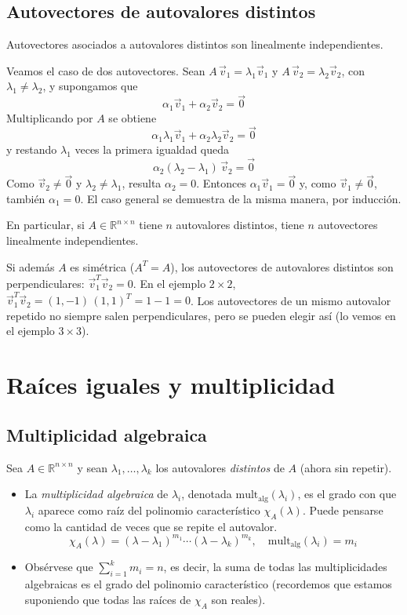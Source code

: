 \documentclass{article}
\newcommand{\vect}[1]{\vec{#1}}
\begin{document}
\subsection*{Autovectores de autovalores distintos}
Autovectores asociados a autovalores distintos son linealmente independientes.

Veamos el caso de dos autovectores. Sean \(A\,\vect{v}_1=\lambda_1 \vect{v}_1\) y \(A\,\vect{v}_2=\lambda_2 \vect{v}_2\), con \(\lambda_1\neq\lambda_2\), y supongamos que
\[
\alpha_1 \vect{v}_1+\alpha_2 \vect{v}_2=\vect{0}
\]
Multiplicando por \(A\) se obtiene
\[
\alpha_1\lambda_1 \vect{v}_1+\alpha_2\lambda_2 \vect{v}_2=\vect{0}
\]
y restando \(\lambda_1\) veces la primera igualdad queda
\[
\alpha_2(\lambda_2-\lambda_1)\,\vect{v}_2=\vect{0}
\]
Como \(\vect{v}_2\neq\vect{0}\) y \(\lambda_2\neq\lambda_1\), resulta \(\alpha_2=0\). Entonces \(\alpha_1 \vect{v}_1=\vect{0}\) y, como \(\vect{v}_1\neq\vect{0}\), también \(\alpha_1=0\). El caso general se demuestra de la misma manera, por inducción.

En particular, si \(A\in\mathbb{R}^{n\times n}\) tiene \(n\) autovalores distintos, tiene \(n\) autovectores linealmente independientes.

Si además \(A\) es simétrica (\(A^T=A\)), los autovectores de autovalores distintos son perpendiculares: \(\vect{v}_1^T\vect{v}_2=0\). En el ejemplo \(2\times2\), \(\vect{v}_1^T\vect{v}_2=(1,-1)\,(1,1)^T=1-1=0\). Los autovectores de un mismo autovalor repetido no siempre salen perpendiculares, pero se pueden elegir así (lo vemos en el ejemplo \(3\times3\)).



\section*{Raíces iguales y multiplicidad}


\subsection*{Multiplicidad algebraica}
Sea \(A\in\mathbb{R}^{n\times n}\) y sean \(\lambda_1,\dots,\lambda_k\) los autovalores \emph{distintos} de \(A\) (ahora sin repetir).
\begin{itemize}
  \item La \emph{multiplicidad algebraica} de \(\lambda_i\), denotada \(\mathrm{mult}_{\mathrm{alg}}(\lambda_i)\), es el grado con que \(\lambda_i\) aparece como raíz del polinomio característico \(\chi_A(\lambda)\). Puede pensarse como la cantidad de veces que se repite el autovalor.
  \[
    \chi_A(\lambda) = (\lambda - \lambda_1)^{m_1}\cdots(\lambda - \lambda_k)^{m_k},
    \quad
    \mathrm{mult}_{\mathrm{alg}}(\lambda_i)=m_i
  \]

  \item Obsérvese que
  \(\sum_{i=1}^k m_i = n\),
  es decir, la suma de todas las multiplicidades algebraicas es el grado del polinomio característico (recordemos que estamos suponiendo que todas las raíces de \(\chi_A\) son reales).
\end{itemize}
\end{document}
